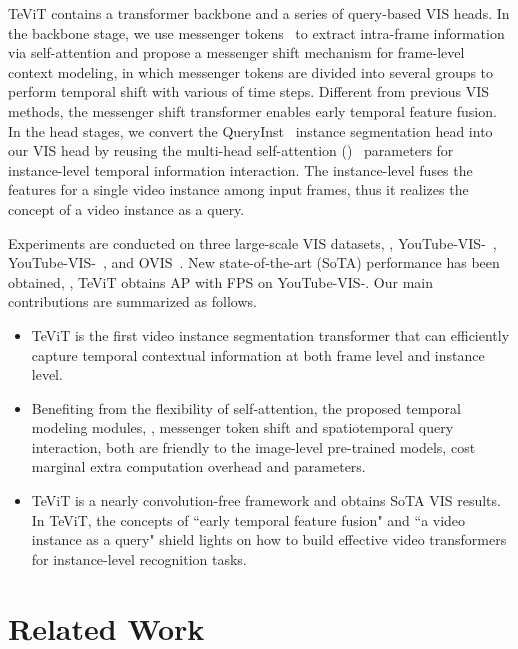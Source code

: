 \documentclass[10pt,twocolumn,letterpaper]{article}
\begin{document}
TeViT contains a transformer backbone and a series of query-based VIS heads. In the backbone stage, we use messenger tokens~\cite{msgtransformer} to extract intra-frame information via self-attention and propose a messenger shift mechanism for frame-level context modeling, in which messenger tokens are divided into several groups to perform temporal shift with various of time steps. Different from previous VIS methods, the messenger shift transformer enables early temporal feature fusion. 
In the head stages, we convert the QueryInst~\cite{queryinst} instance segmentation head into our VIS head by reusing the multi-head self-attention ()~\cite{transformer} parameters for instance-level temporal information interaction. The instance-level  fuses the features for a single video instance among input frames, thus it realizes the concept of a video instance as a query.

Experiments are conducted on three large-scale VIS datasets, \ie, YouTube-VIS-~\cite{vis}, YouTube-VIS-~\cite{vis2021}, and OVIS~\cite{ovis}. New state-of-the-art (SoTA) performance has been obtained, \eg, TeViT obtains  AP with  FPS on YouTube-VIS-. Our main contributions are summarized as follows.

\begin{itemize}
\item TeViT is the first video instance segmentation transformer that can efficiently capture temporal contextual information at both frame level and instance level.
\item Benefiting from the flexibility of self-attention, the proposed temporal modeling modules, \ie, messenger token shift and spatiotemporal query interaction, both are friendly to the image-level pre-trained models, cost marginal extra computation overhead and parameters.
\item TeViT is a nearly convolution-free framework and obtains SoTA VIS results. In TeViT, the concepts of ``early temporal feature fusion" and ``a video instance as a query" shield lights on how to build effective video transformers for instance-level recognition tasks.
\end{itemize}

\section{Related Work}
\end{document}

